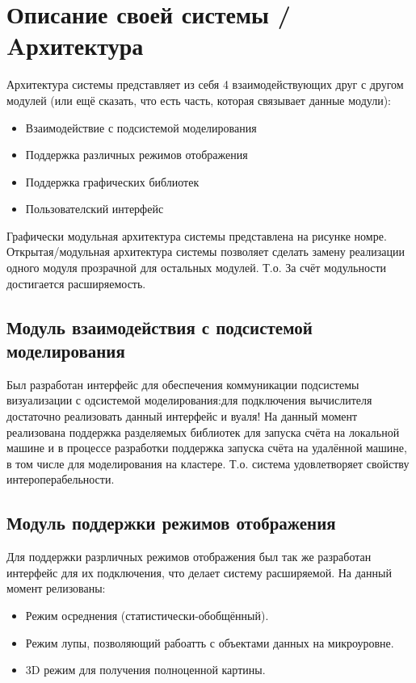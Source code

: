 \documentclass[a4paper,12pt]{extarticle}
\let\stdsection\section
\renewcommand\section{\newpage\stdsection}
\begin{document}
\section{Описание своей системы / Aрхитектура}
Архитектура системы представляет из себя 4 взаимодействующих друг с другом модулей (или ещё сказать, что есть часть, которая связывает данные модули):
\begin{itemize}
    \item Взаимодействие с подсистемой моделирования
    \item Поддержка различных режимов отображения
    \item Поддержка графических библиотек
    \item Пользователский интерфейс
\end{itemize}
Графически модульная архитектура системы представлена на рисунке номре.
Открытая/модульная архитектура системы позволяет сделать замену реализации одного модуля прозрачной для остальных модулей. Т.о. За счёт модульности достигается расширяемость.

\subsection{Модуль взаимодействия с подсистемой моделирования}

Был разработан интерфейс для обеспечения коммуникации подсистемы визуализации с одсистемой моделирования:для подключения вычислителя достаточно реализовать данный интерфейс и вуаля! На данный момент реализована поддержка разделяемых библиотек для запуска счёта на локальной машине и в процессе разработки поддержка запуска счёта на удалённой машине, в том числе для моделирования на кластере. Т.о. система удовлетворяет свойству интероперабельности.

\subsection{Модуль поддержки режимов отображения}

Для поддержки разрличных режимов отображения был так же разработан интерфейс для их подключения, что делает систему расширяемой. На данный момент релизованы:
\begin{itemize}
    \item Режим осреднения (статистически-обобщённый).
    \item Режим лупы, позволяющий рабоатть с объектами данных на микроуровне.
    \item 3D режим для получения полноценной картины.
\end{itemize}
\end{document}
